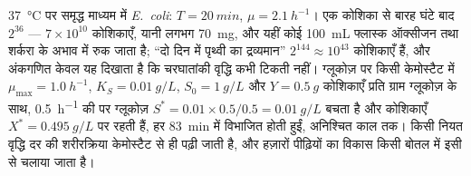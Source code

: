 \begin{example}[संख्याओं में कोई संवर्धन]\label{ex:b3:bacteriology:numbers}
\qty{37}{\celsius} पर समृद्ध माध्यम में \emph{E.~coli}: $T = \qty{20}{min}$,
$\mu = \qty{2.1}{h^{-1}}$। एक कोशिका से बारह घंटे बाद $2^{36}$
--- $7\times 10^{10}$ कोशिकाएँ, यानी लगभग \qty{70}{mg}, और यहीं कोई
\qty{100}{mL} फ्लास्क ऑक्सीजन तथा शर्करा के अभाव में रुक जाता है; ``दो
दिन में पृथ्वी का द्रव्यमान'' $2^{144}\approx 10^{43}$ कोशिकाएँ हैं, और
अंकगणित केवल यह दिखाता है कि चरघातांकी वृद्धि कभी टिकती नहीं। ग्लूकोज़
पर किसी केमोस्टैट में $\mu_{\max} = \qty{1.0}{h^{-1}}$, $K_{S} =
\qty{0.01}{g/L}$, $S_{0} = \qty{1}{g/L}$ और $Y = \qty{0.5}{g}$
कोशिकाएँ प्रति ग्राम ग्लूकोज़ के साथ, \qty{0.5}{h^{-1}} की 
पर ग्लूकोज़ $S^{*}
= 0.01\times 0.5/0.5 = \qty{0.01}{g/L}$ बचता है और कोशिकाएँ $X^{*} =
\qty{0.495}{g/L}$ पर रहती हैं, हर \qty{83}{min} में विभाजित होती हुईं,
अनिश्चित काल तक। किसी नियत वृद्धि दर की शरीरक्रिया केमोस्टैट से ही
पढ़ी जाती है, और हज़ारों पीढ़ियों का विकास किसी बोतल में इसी से चलाया
जाता है।
\end{example}

